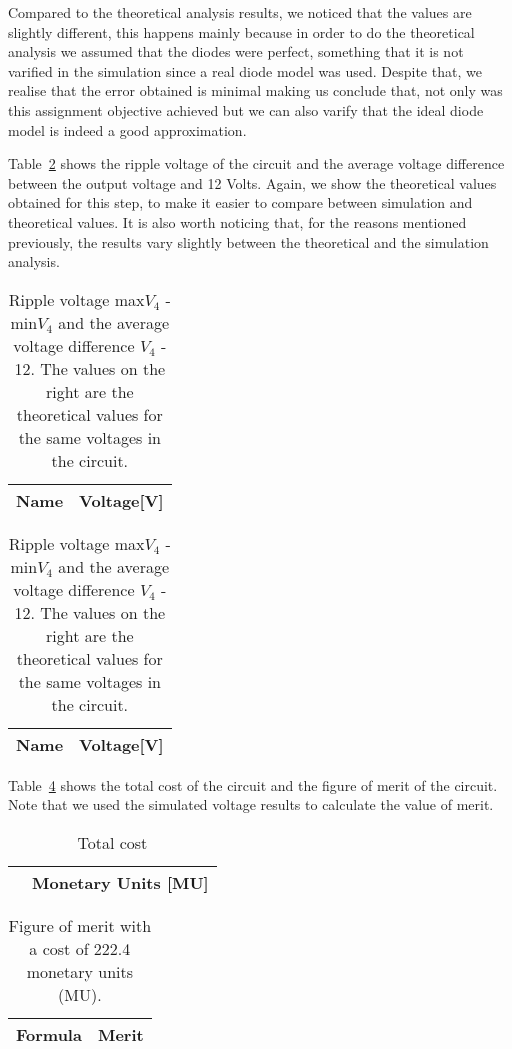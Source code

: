 	Compared to the theoretical analysis results, we noticed that the values are slightly different, this happens mainly because in order to do the theoretical analysis we assumed that the diodes were perfect, something that it is not varified in the simulation since a real diode model was used. Despite that, we realise that the error obtained is minimal making us conclude that, not only was this assignment objective achieved but we can also varify that the ideal diode model is indeed a good approximation.


Table~\ref{tab2:op} shows the ripple voltage of the circuit and the average voltage difference
between the output voltage and 12 Volts. Again, we show the theoretical values obtained for this step, 
to make it easier to compare between simulation and theoretical values. It is also worth noticing that, for the reasons mentioned previously, the results vary slightly between the theoretical and the simulation analysis.


\begin{table}[H]
  \centering
  \begin{tabular}{|l|r|}
    \hline    
    {\bf Name} & {\bf Voltage[V]} \\ \hline
    
  \end{tabular}
  \begin{tabular}{|l|r|}
    \hline    
    {\bf Name} & {\bf Voltage[V]} \\ \hline
    
  \end{tabular}
  \caption{Ripple voltage max$V_4$ - min$V_4$ and the average voltage difference $V_4$ - 12. The values on the right are the theoretical 
  values for the same voltages in the circuit.}
  \label{tab2:op}
\end{table}


Table~\ref{tab3:op} shows the total cost of the circuit and the figure of merit of the circuit. 
Note that we used the simulated voltage results to calculate the value of merit.
\begin{table}[H]
  \centering
  \begin{tabular}{|l|r|}
     \hline    
    { } & {\bf Monetary Units [MU]} \\ \hline   
    
  \end{tabular}
  \caption{Total cost}
  \label{tab:cost}
\end{table}


\begin{table}[H]
  \centering
  \begin{tabular}{|l|r|}
    \hline    
    {\bf Formula} & {\bf Merit} \\ \hline
    
  \end{tabular}
  \caption{Figure of merit with a cost of 222.4 monetary units (MU).}
  \label{tab3:op}
\end{table}

